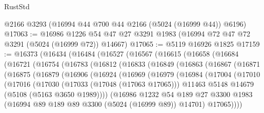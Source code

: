 \begin{lexlean}{RustStd}
\begin{coremodule}
    @2166
    @3293
    (@16994 @44 @700 @44 @2166 (@5024 (@16999 @44)) @6196)
@17063 := @16986
    @1226
    @54
    @47
    @27
    @3291
    @1983
    (@16994 @72 @47 @72 @3291 (@5024 (@16999 @72)) @14667)
@17065 := @5119 @16926 @1825
@17159 := @16373
    (@16434
      (@16484
        (@16527
          (@16567
            (@16615
              (@16658
                (@16684
                  (@16721
                    (@16754
                      (@16783
                        (@16812
                          (@16833
                            (@16849
                              (@16863
                                (@16867
                                  (@16871
                                    (@16875
                                      (@16879
                                        (@16906
                                          (@16924
                                            (@16969
                                              (@16979
                                                (@16984
                                                  (@17004
                                                    (@17010
                                                      (@17016
                                                        (@17030
                                                          (@17033 (@17048 (@17063 @17065)))
                                                          @11463
                                                          @5148
                                                          @14679
                                                          (@5108 (@5163 @3650 @1989))))
                                                      (@16986
                                                        @1232
                                                        @54
                                                        @189
                                                        @27
                                                        @3300
                                                        @1983
                                                        (@16994
                                                          @89
                                                          @189
                                                          @89
                                                          @3300
                                                          (@5024 (@16999 @89))
                                                          @14701)
                                                        @17065))))

\end{coremodule}
\end{lexlean}
